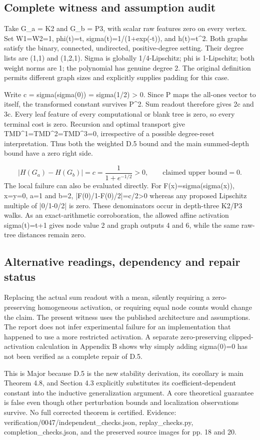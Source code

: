 \documentclass[10pt]{article}
\begin{document}
\subsection*{Complete witness and assumption audit}
Take G\_a = K2 and G\_b = P3, with scalar raw features zero on every vertex. Set W1=W2=1, phi(t)=t, sigma(t)=1/(1+exp(-t)), and h(t)=t\textasciicircum{}2. Both graphs satisfy the binary, connected, undirected, positive-degree setting. Their degree lists are (1,1) and (1,2,1). Sigma is globally 1/4-Lipschitz; phi is 1-Lipschitz; both weight norms are 1; the polynomial has genuine degree 2. The original definition permits different graph sizes and explicitly supplies padding for this case.\par
Write c = sigma(sigma(0)) = sigma(1/2) > 0. Since P maps the all-ones vector to itself, the transformed constant survives P\textasciicircum{}2. Sum readout therefore gives 2c and 3c. Every leaf feature of every computational or blank tree is zero, so every terminal cost is zero. Recursion and optimal transport give TMD\textasciicircum{}1=TMD\textasciicircum{}2=TMD\textasciicircum{}3=0, irrespective of a possible degree-reset interpretation. Thus both the weighted D.5 bound and the main summed-depth bound have a zero right side.\par
\[\big|H(G_a)-H(G_b)\big|=c=\frac{1}{1+e^{-1/2}}>0,\qquad \text{claimed upper bound}=0.\] The local failure can also be evaluated directly. For F(x)=sigma(sigma(x)), x=y=0, a=1 and b=2, |F(0)/1-F(0)/2|=c/2>0 whereas any proposed Lipschitz multiple of |0/1-0/2| is zero. These denominators occur in depth-three K2/P3 walks. As an exact-arithmetic corroboration, the allowed affine activation sigma(t)=t+1 gives node value 2 and graph outputs 4 and 6, while the same raw-tree distances remain zero.\par
\subsection*{Alternative readings, dependency and repair status}
Replacing the actual sum readout with a mean, silently requiring a zero-preserving homogeneous activation, or requiring equal node counts would change the claim. The present witness uses the published architecture and assumptions. The report does not infer experimental failure for an implementation that happened to use a more restricted activation. A separate zero-preserving clipped-activation calculation in Appendix B shows why simply adding sigma(0)=0 has not been verified as a complete repair of D.5.\par
This is Major because D.5 is the new stability derivation, its corollary is main Theorem 4.8, and Section 4.3 explicitly substitutes its coefficient-dependent constant into the inductive generalization argument. A core theoretical guarantee is false even though other perturbation bounds and localization observations survive. No full corrected theorem is certified. Evidence: verification/0047/independent\_checks.json, replay\_checks.py, completion\_checks.json, and the preserved source images for pp. 18 and 20.\par
\end{document}
